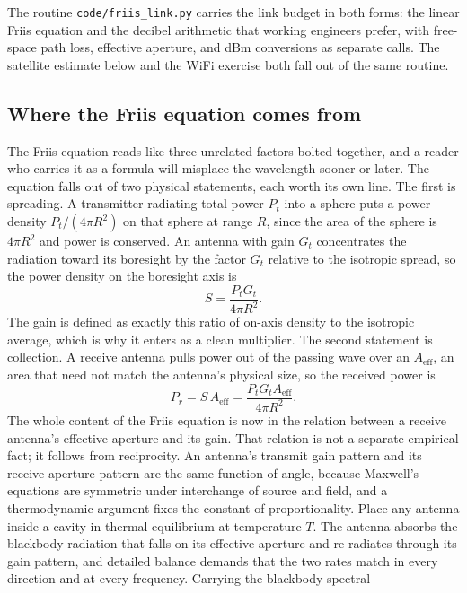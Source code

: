 

The routine \texttt{code/friis\_link.py} carries the link budget in
both forms: the linear Friis equation and the decibel arithmetic that
working engineers prefer, with free-space path loss, effective aperture,
and dBm conversions as separate calls. The satellite estimate below and
the WiFi exercise both fall out of the same routine.

\subsection{Where the Friis equation comes from}

The Friis equation reads like three unrelated factors bolted together,
and a reader who carries it as a formula will misplace the wavelength
sooner or later. The equation falls out of two physical statements, each
worth its own line. The first is spreading. A transmitter radiating
total power $P_t$ into a sphere puts a power density $P_t/(4\pi R^2)$ on
that sphere at range $R$, since the area of the sphere is $4\pi R^2$ and
power is conserved. An antenna with gain $G_t$ concentrates the radiation
toward its boresight by the factor $G_t$ relative to the isotropic
spread, so the power density on the boresight axis is
\[
S = \frac{P_t G_t}{4\pi R^2}.
\]
The gain is defined as exactly this ratio of on-axis density to the
isotropic average, which is why it enters as a clean multiplier. The
second statement is collection. A receive antenna pulls power out of the
passing wave over an  $A_{\text{eff}}$, an
area that need not match the antenna's physical size, so the received
power is
\[
P_r = S\, A_{\text{eff}} = \frac{P_t G_t A_{\text{eff}}}{4\pi R^2}.
\]
The whole content of the Friis equation is now in the relation between a
receive antenna's effective aperture and its gain. That relation is not a
separate empirical fact; it follows from reciprocity. An antenna's
transmit gain pattern and its receive aperture pattern are the same
function of angle, because Maxwell's equations are symmetric under
interchange of source and field, and a thermodynamic argument fixes the
constant of proportionality. Place any antenna inside a cavity in thermal
equilibrium at temperature $T$. The antenna absorbs the blackbody
radiation that falls on its effective aperture and re-radiates through its
gain pattern, and detailed balance demands that the two rates match in
every direction and at every frequency. Carrying the blackbody spectral
